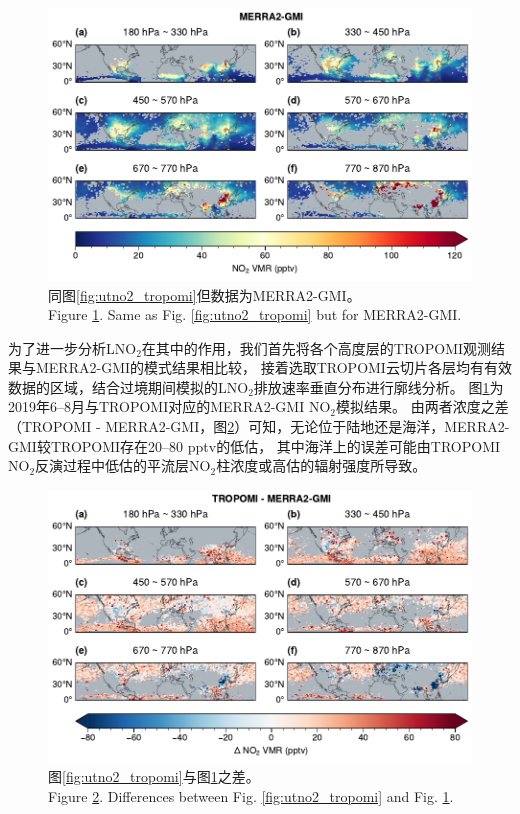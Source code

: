 \begin{figure}[!htbp]
    \centering
    \includegraphics[width=14cm]{./figures/utno2_merra2-gmi.pdf}
    \caption{
    同图\ref{fig:utno2_tropomi}但数据为MERRA2-GMI。 \\
    Figure \ref{fig:utno2_merra2}. Same as Fig. \ref{fig:utno2_tropomi} but for MERRA2-GMI.
    }
    \label{fig:utno2_merra2}
\end{figure}


为了进一步分析LNO$_2$在其中的作用，我们首先将各个高度层的TROPOMI观测结果与MERRA2-GMI的模式结果相比较，
接着选取TROPOMI云切片各层均有有效数据的区域，结合过境期间模拟的LNO$_2$排放速率垂直分布进行廓线分析。
图\ref{fig:utno2_merra2}为2019年6--8月与TROPOMI对应的MERRA2-GMI NO$_2$模拟结果。
由两者浓度之差（TROPOMI - MERRA2-GMI，图\ref{fig:utno2_delta}）可知，无论位于陆地还是海洋，MERRA2-GMI较TROPOMI存在20--80 pptv的低估，
其中海洋上的误差可能由TROPOMI NO$_2$反演过程中低估的平流层NO$_2$柱浓度或高估的辐射强度所导致\citep{VanGeffen.2020}。

\begin{figure}[!htbp]
    \centering
    \includegraphics[width=14cm]{./figures/utno2_delta.pdf}
    \caption{
    图\ref{fig:utno2_tropomi}与图\ref{fig:utno2_merra2}之差。 \\
    Figure \ref{fig:utno2_delta}. Differences between Fig. \ref{fig:utno2_tropomi} and Fig. \ref{fig:utno2_merra2}.
    }
    \label{fig:utno2_delta}
\end{figure}


